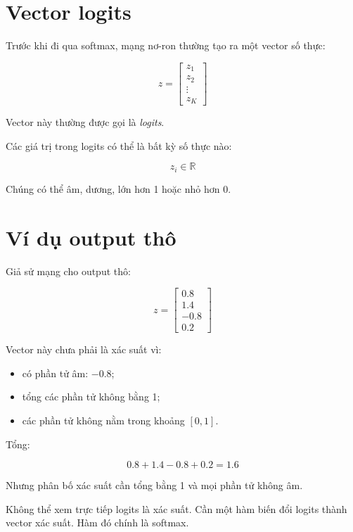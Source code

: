\documentclass[12pt,a4paper]{report}
\begin{document}
\section{Vector logits}

Trước khi đi qua softmax, mạng nơ-ron thường tạo ra một vector số thực:

\[
    z =
    \begin{bmatrix}
    z_1\\
    z_2\\
    \vdots\\
    z_K
    \end{bmatrix}
\]

Vector này thường được gọi là \textit{logits}.

Các giá trị trong logits có thể là bất kỳ số thực nào:

\[
    z_i \in \mathbb{R}
\]

Chúng có thể âm, dương, lớn hơn 1 hoặc nhỏ hơn 0.

\section{Ví dụ output thô}

Giả sử mạng cho output thô:

\[
    z =
    \begin{bmatrix}
    0.8\\
    1.4\\
    -0.8\\
    0.2
    \end{bmatrix}
\]

Vector này chưa phải là xác suất vì:

\begin{itemize}
    \item có phần tử âm: $-0.8$;
    \item tổng các phần tử không bằng 1;
    \item các phần tử không nằm trong khoảng $[0,1]$.
\end{itemize}

Tổng:

\[
    0.8 + 1.4 - 0.8 + 0.2 = 1.6
\]

Nhưng phân bố xác suất cần tổng bằng 1 và mọi phần tử không âm.

\begin{canhbao}
Không thể xem trực tiếp logits là xác suất. Cần một hàm biến đổi logits thành vector xác suất. Hàm đó chính là softmax.
\end{canhbao}
\end{document}

